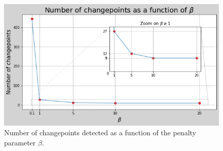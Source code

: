 \documentclass[11pt]{article}
\begin{document}
\begin{figure}[H]
    \centering
    \begin{minipage}[t]{0.52\textwidth}
    \includegraphics[width=\textwidth]{figures/results/cgpts_beta.png}
    \caption{Number of changepoints detected as a function of the penalty parameter $\beta$.}
    \label{fig:cgpts_beta}
    \end{minipage}
\end{figure}
\end{document}
